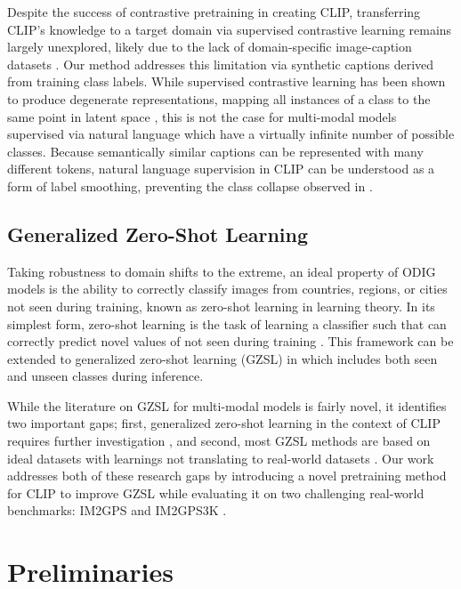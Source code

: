 \documentclass{article}
\renewcommand{\cite}[1]{\citep{#1}}
\begin{document}
Despite the success of contrastive pretraining in creating CLIP, transferring CLIP's knowledge to a target domain via supervised contrastive learning \cite{khosla_2020} remains largely unexplored, likely due to the lack of domain-specific image-caption datasets \cite{clip_rsicd}. Our method addresses this limitation via synthetic captions derived from training class labels. While supervised contrastive learning has been shown to produce degenerate representations, mapping all instances of a class to the same point in latent space \cite{chen_2022d}, this is not the case for multi-modal models supervised via natural language which have a virtually infinite number of possible classes. Because semantically similar captions can be represented with many different tokens, natural language supervision in CLIP can be understood as a form of label smoothing, preventing the class collapse observed in \citet{chen_2022d}.

\subsection{Generalized Zero-Shot Learning}

Taking robustness to domain shifts to the extreme, an ideal property of ODIG models is the ability to correctly classify images from countries, regions, or cities not seen during training, known as zero-shot learning in learning theory. In its simplest form, zero-shot learning is the task of learning a classifier  such that  can correctly predict novel values of  not seen during training \cite{palatucci_2009}. This framework can be extended to generalized zero-shot learning (GZSL) in which  includes both seen and unseen classes during inference.

While the literature on GZSL for multi-modal models is fairly novel, it identifies two important gaps; first, generalized zero-shot learning in the context of CLIP requires further investigation \cite{pourpanah_2022}, and second, most GZSL methods are based on ideal datasets with learnings not translating to real-world datasets \cite{pourpanah_2022}. Our work addresses both of these research gaps by introducing a novel pretraining method for CLIP to improve GZSL while evaluating it on two challenging real-world benchmarks: IM2GPS \cite{hays_2008} and IM2GPS3K \cite{vo_et_al}.

\section{Preliminaries}
\label{sec:prelimiaries}
\end{document}
